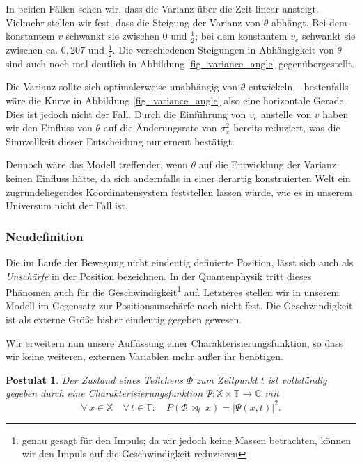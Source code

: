 \documentclass[a4paper,12pt,ngerman]{scrartcl}
\theoremstyle{plain}
\theoremstyle{plain}
\theoremstyle{plain}
\newtheorem{postulate}{Postulat}
\theoremstyle{plain}
\newcommand{\C}{\mathbb{C}}
\newcommand{\T}{\mathbb{T}}
\newcommand{\X}{\mathbb{X}}
\newcommand{\at}[1]{\;\rtimes_{#1}\;}
\begin{document}
In beiden Fällen sehen wir, dass die Varianz über die Zeit linear ansteigt. Vielmehr stellen wir fest, dass die Steigung der Varianz von $\theta$ abhängt. Bei dem konstantem $v$ schwankt sie zwischen 0 und $\frac{1}{2}$; bei dem konstantem $v_e$ schwankt sie zwischen ca. $0,207$ und $\frac{1}{2}$. Die verschiedenen Steigungen in Abhängigkeit von $\theta$ sind auch noch mal deutlich in Abbildung \ref{fig_variance_angle} gegenübergestellt.

Die Varianz sollte sich optimalerweise unabhängig von $\theta$ entwickeln -- bestenfalls wäre die Kurve in Abbildung \ref{fig_variance_angle} also eine horizontale Gerade. Dies ist jedoch nicht der Fall. Durch die Einführung von $v_e$ anstelle von $v$ haben wir den Einfluss von $\theta$ auf die Änderungsrate von $\sigma_x^2$ bereits reduziert, was die Sinnvollkeit dieser Entscheidung nur erneut bestätigt. 

Dennoch wäre das Modell treffender, wenn $\theta$ auf die Entwicklung der Varianz keinen Einfluss hätte, da sich andernfalls in einer derartig konstruierten Welt ein zugrundeliegendes Koordinatensystem feststellen lassen würde, wie es in unserem Universum nicht der Fall ist.

\subsubsection{Neudefinition}

Die im Laufe der Bewegung nicht eindeutig definierte Position, lässt sich auch als \textit{Unschärfe} in der Position bezeichnen. In der Quantenphysik tritt dieses Phänomen auch für die Geschwindigkeit\footnote{genau gesagt für den Impuls; da wir jedoch keine Massen betrachten, können wir den Impuls auf die Geschwindigkeit reduzieren} auf. Letzteres stellen wir in unserem Modell im Gegensatz zur Positionsunschärfe noch nicht fest. Die Geschwindigkeit ist als externe Größe bisher eindeutig gegeben gewesen.

Wir erweitern nun unsere Auffassung einer Charakterisierungsfunktion, so dass wir keine weiteren, externen Variablen mehr außer ihr benötigen.

\begin{postulate}
Der Zustand eines Teilchens $\Phi$ zum Zeitpunkt $t$ ist vollständig gegeben durch eine Charakterisierungsfunktion $\Psi: \X\times\T\rightarrow\C$ mit
\[\forall\, x\in\X\quad\forall\, t\in\T:\quad
P(\Phi\at{t}x)=|\Psi(x,t)|^2.\]
\end{postulate}
\end{document}
